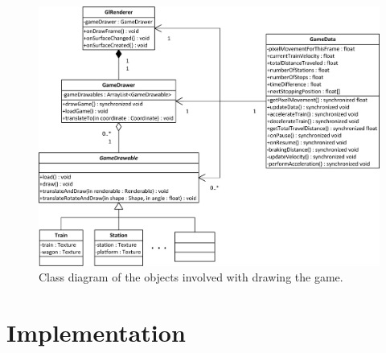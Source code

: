 \begin{figure}[H]
\centering
\includegraphics[width=0.9\linewidth]{img/game.png}%
\caption{Class diagram of the objects involved with drawing the game.}
\label{fig:game}
\end{figure}

\section{Implementation}

